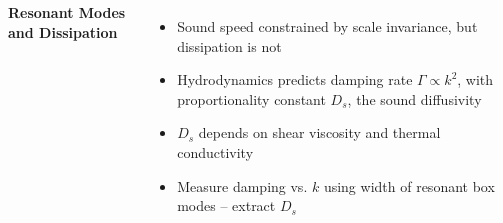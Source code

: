 \documentclass[26pt, paperwidth=36in,paperheight=48in]{tikzposter} %
\newcommand{\myfont}{\fontsize{24}{30}\selectfont}
\begin{document}
\begin{columns}
{\begin{minipage}{0.3\textwidth}
	\end{minipage}
	
	\vspace{0cm}
	\begin{minipage}{0.2\textwidth}
		\flushleft
		\textbf{Resonant Modes and Dissipation}
		\vspace{0.5cm}
		\myfont
		\begin{minipage}{0.8\textwidth}
			\flushleft
			\vspace{1.2cm}
			\begin{itemize}
				\item Sound speed constrained by scale invariance, but dissipation is not
				
				\item Hydrodynamics predicts damping rate $\Gamma \propto k^2$, with proportionality constant $D_s$, the sound diffusivity
				
				\item $D_s$ depends on shear viscosity and thermal conductivity 
				
				\item Measure damping vs. $k$ using width of resonant box modes -- extract $D_s$
			\end{itemize}
		\end{minipage}
		

\end{minipage}}
\end{columns}
\end{document}
